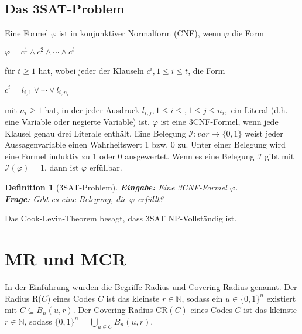 \documentclass[11pt]{article}
\theoremstyle{break}
\newtheorem{definition}{Definition}
\theoremstyle{norm}
\begin{document}
\subsection{Das 3SAT-Problem}
\label{sat}
Eine  Formel $\varphi$ ist in konjunktiver Normalform (CNF), wenn $\varphi$ die Form 
\begin{center}
    $\varphi = c^1 \land c^2 \land \dotsb \land c^t$
\end{center}
für $t\geq1$ hat, wobei jeder der Klauseln $c^i, 1\leq i \leq t$, die Form 
\begin{center}
    $c^i = l_{i,1} \lor \dotsb \lor l_{i,n_i}$
\end{center}
mit $n_i\geq1$ hat, in der jeder Ausdruck $l_{i,j}, 1\leq i \leq , 1 \leq j \leq n_i,$ ein Literal (d.h. eine Variable oder negierte Variable) ist. $\varphi$ ist eine 3CNF-Formel, wenn jede Klausel genau drei Literale enthält.
Eine Belegung $\mathcal{I}: var \rightarrow \{0,1\}$ weist jeder Aussagenvariable einen Wahrheitswert 1 bzw. 0 zu. Unter einer Belegung wird eine Formel induktiv zu 1 oder 0 ausgewertet. Wenn es eine Belegung $\mathcal{I}$ gibt mit $\mathcal{I}(\varphi)=1$, dann ist $\varphi$ erfüllbar.
\begin{definition}[3SAT-Problem]
    \textbf{Eingabe:} Eine 3CNF-Formel $\varphi$.\\
\textbf{Frage:} Gibt es eine Belegung, die $\varphi$ erfüllt?   
\end{definition}
\noindent
Das Cook-Levin-Theorem \cite{Cook1971TheCO} besagt, dass 3SAT NP-Vollständig ist.

\section{MR und MCR}\label{absch3}
In der Einführung wurden die Begriffe Radius und Covering Radius genannt. Der Radius R($C$) eines Codes $C$ ist das kleinste $r \in \mathbb{N}$, sodass ein $u \in \{0,1\}^n$ existiert mit $C\subseteq B_n(u,r)$.
Der Covering Radius $\text{CR}(C)$ eines Codes $C$ ist das kleinste $r \in \mathbb{N}$, sodass $\{0,1\}^n =  \bigcup_{u \in C} B_n(u,r)$.
\end{document}
